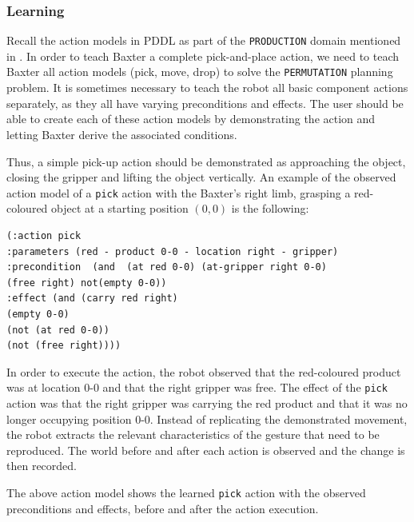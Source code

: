 \subsubsection{Learning}
\label{Create an action model}
Recall the action models in PDDL as part of the \texttt{PRODUCTION} domain mentioned in .
In order to teach Baxter a complete pick-and-place action, we need to teach Baxter all action models (pick, move, drop) to solve the \texttt{PERMUTATION} planning problem.
It is sometimes necessary to teach the robot all basic component actions separately, as they all have varying preconditions and effects.
The user should be able to create each of these action models by demonstrating the action and letting Baxter derive the associated conditions.


Thus, a simple pick-up action should be demonstrated as approaching the object, closing the gripper and lifting the object vertically.
An example of the observed action model of a \texttt{pick} action with the Baxter's right limb, grasping a red-coloured object at a starting position $(0,0)$ is the following:

\begin{verbatim}
(:action pick
:parameters (red - product 0-0 - location right - gripper)
:precondition  (and  (at red 0-0) (at-gripper right 0-0) 
(free right) not(empty 0-0))
:effect (and (carry red right)
(empty 0-0)
(not (at red 0-0)) 
(not (free right))))
\end{verbatim}
In order to execute the action, the robot observed that the red-coloured product was at location 0-0 and that the right gripper was free.
The effect of the \texttt{pick} action was that the right gripper was carrying the red product and that it was no longer occupying position 0-0.
Instead of replicating the demonstrated movement, the robot extracts the relevant characteristics of the gesture that need to be reproduced.
The world before and after each action is observed and the change is then recorded.


The above action model shows the learned \texttt{pick} action with the observed preconditions and effects, before and after the action execution.

